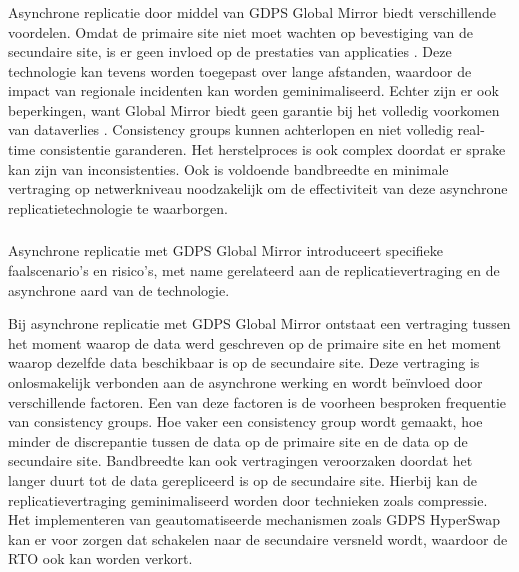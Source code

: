 \subsubsection{}%
\label{sec:twee-asynchrone-sites-voordelen-beperkingen}

Asynchrone replicatie door middel van GDPS Global Mirror biedt verschillende voordelen.
Omdat de primaire site niet moet wachten op bevestiging van de secundaire site, is er geen invloed op de prestaties van applicaties \autocite{gomes_2025_redbooks}.
Deze technologie kan tevens worden toegepast over lange afstanden, waardoor de impact van regionale incidenten kan worden geminimaliseerd.
Echter zijn er ook beperkingen, want Global Mirror biedt geen garantie bij het volledig voorkomen van dataverlies \autocite{gomes_2025_redbooks}.
Consistency groups kunnen achterlopen en niet volledig real-time consistentie garanderen.
Het herstelproces is ook complex doordat er sprake kan zijn van inconsistenties.
Ook is voldoende bandbreedte en minimale vertraging op netwerkniveau noodzakelijk om de effectiviteit van deze asynchrone replicatietechnologie te waarborgen.

\subsubsection{}
\label{sec:twee-asynchrone-sites-failures-risks}

Asynchrone replicatie met GDPS Global Mirror introduceert specifieke faalscenario's en risico's, met name gerelateerd aan de replicatievertraging en de asynchrone aard van de technologie.

Bij asynchrone replicatie met GDPS Global Mirror ontstaat een vertraging tussen het moment waarop de data werd geschreven op de primaire site en het moment waarop dezelfde data beschikbaar is op de secundaire site.
Deze vertraging is onlosmakelijk verbonden aan de asynchrone werking en wordt beïnvloed door verschillende factoren.
Een van deze factoren is de voorheen besproken frequentie van consistency groups. 
Hoe vaker een consistency group wordt gemaakt, hoe minder de discrepantie tussen de data op de primaire site en de data op de secundaire site.
Bandbreedte kan ook vertragingen veroorzaken doordat het langer duurt tot de data gerepliceerd is op de secundaire site.
Hierbij kan de replicatievertraging geminimaliseerd worden door technieken zoals compressie. 
Het implementeren van geautomatiseerde mechanismen zoals GDPS HyperSwap kan er voor zorgen dat schakelen naar de secundaire versneld wordt, waardoor de RTO ook kan worden verkort.

